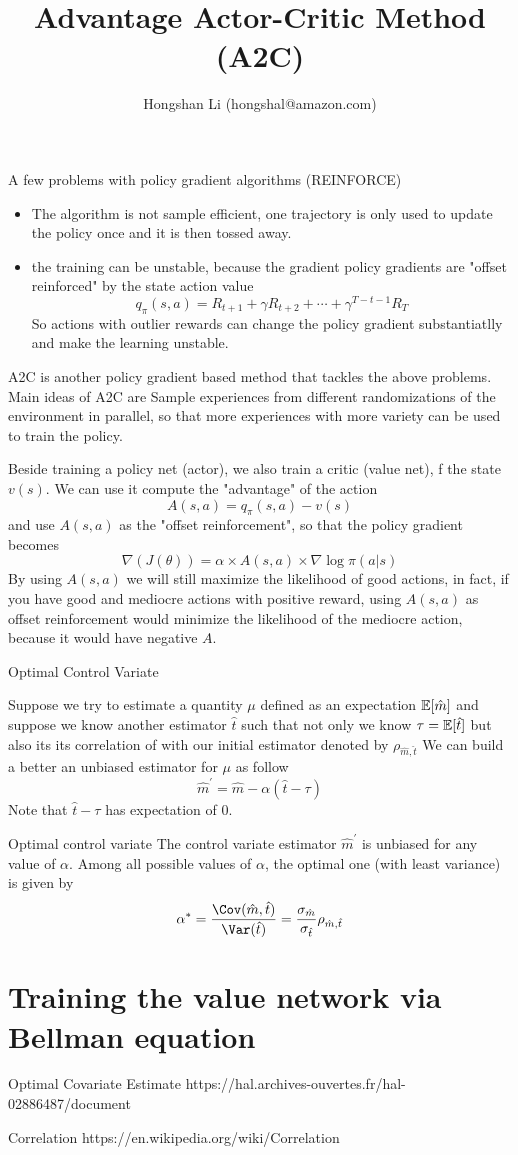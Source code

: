 \documentclass{article}
\title{Advantage Actor-Critic Method (A2C)}
\author{Hongshan Li (hongshal@amazon.com)}
\begin{document}
\maketitle

A few problems with policy gradient algorithms (REINFORCE)
\begin{itemize}
    \item The algorithm is not sample efficient, one trajectory
        is only used to update the policy once and it is then
        tossed away.
    \item the training can be unstable, because the gradient 
        policy gradients are "offset reinforced" by the
        state action value 
        \[
            q_{\pi}(s, a) = R_{t+1} + \gamma R_{t+2} + \cdots + 
                \gamma^{T-t-1}R_T
        \]
        So actions with outlier rewards can change the policy gradient
        substantiatlly and make the learning unstable. 
\end{itemize}

    
A2C is another policy gradient based method that tackles the above problems. 
Main ideas of A2C are
Sample experiences from different randomizations of the environment 
in parallel, so that more experiences with more variety can be used 
to train the policy. 

Beside training a policy net (actor), we also train a critic (value net),
f the state $v(s)$. We can use it compute the 
"advantage" of the action
\[
  A(s, a) = q_{\pi}(s, a) - v(s)
\]
and use $A(s, a)$ as the "offset reinforcement", so that the policy gradient 
becomes
\[
  \nabla(J(\theta)) = \alpha \times A(s, a) \times \nabla\log\pi(a|s)
\]
By using $A(s, a)$ we will still maximize the likelihood of good actions,
in fact, if you have good and mediocre actions with positive reward, 
using $A(s, a)$ as offset reinforcement would minimize the likelihood
of the mediocre action, because it would have negative $A$. 

Optimal Control Variate

Suppose we try to estimate a quantity $\mu$ defined as an expectation
$\mathbb{E}[\hat m]$ and suppose we know another estimator $\hat t$ such 
that not only we know $\tau = \mathbb{E}[\hat t]$ but also its its 
correlation of with our initial estimator denoted by $\rho_{\hat m, \hat t}$
We can build a better an unbiased estimator for $\mu$ as follow
\[
    \hat m ^{\prime} = \hat m - \alpha(\hat t - \tau)
\]
Note that $\hat t - \tau$ has expectation of 0. 

\begin{proposition}{Optimal control variate}
    The control variate estimator $\hat m ^{\prime}$ is unbiased for any
    value of $\alpha$. Among all possible values of $\alpha$, the optimal
    one (with least variance) is given by
    \[
        \alpha^* = \frac{\Cov(\hat m, \hat t)}{\Var(\hat t)} 
        = \frac{\sigma_{\hat m}}{\sigma_{\hat t}} \rho_{\hat m, \hat t}
    \]
\end{proposition}

\section{Training the value network via Bellman equation}



Optimal Covariate Estimate
https://hal.archives-ouvertes.fr/hal-02886487/document

Correlation
https://en.wikipedia.org/wiki/Correlation
\end{document}

